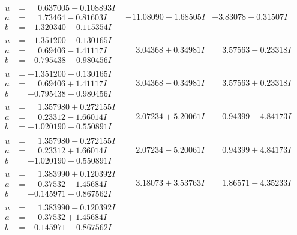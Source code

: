 \documentclass[1p]{elsarticle_modified}
\theoremstyle{definition}
\begin{document}
$$\begin{array}{c|c|c}
\begin{aligned}
u &= \phantom{-}0.637005 - 0.108893 I \\
a &= \phantom{-}1.73464 - 0.81603 I \\
b &= -1.320340 - 0.115354 I\end{aligned}
 & -11.08090 + 1.68505 I & -3.83078 - 0.31507 I \\ \hline\begin{aligned}
u &= -1.351200 + 0.130165 I \\
a &= \phantom{-}0.69406 - 1.41117 I \\
b &= -0.795438 + 0.980456 I\end{aligned}
 & \phantom{-}3.04368 + 0.34981 I & \phantom{-}3.57563 - 0.23318 I \\ \hline\begin{aligned}
u &= -1.351200 - 0.130165 I \\
a &= \phantom{-}0.69406 + 1.41117 I \\
b &= -0.795438 - 0.980456 I\end{aligned}
 & \phantom{-}3.04368 - 0.34981 I & \phantom{-}3.57563 + 0.23318 I \\ \hline\begin{aligned}
u &= \phantom{-}1.357980 + 0.272155 I \\
a &= \phantom{-}0.23312 - 1.66014 I \\
b &= -1.020190 + 0.550891 I\end{aligned}
 & \phantom{-}2.07234 + 5.20061 I & \phantom{-}0.94399 - 4.84173 I \\ \hline\begin{aligned}
u &= \phantom{-}1.357980 - 0.272155 I \\
a &= \phantom{-}0.23312 + 1.66014 I \\
b &= -1.020190 - 0.550891 I\end{aligned}
 & \phantom{-}2.07234 - 5.20061 I & \phantom{-}0.94399 + 4.84173 I \\ \hline\begin{aligned}
u &= \phantom{-}1.383990 + 0.120392 I \\
a &= \phantom{-}0.37532 - 1.45684 I \\
b &= -0.145971 + 0.867562 I\end{aligned}
 & \phantom{-}3.18073 + 3.53763 I & \phantom{-}1.86571 - 4.35233 I \\ \hline\begin{aligned}
u &= \phantom{-}1.383990 - 0.120392 I \\
a &= \phantom{-}0.37532 + 1.45684 I \\
b &= -0.145971 - 0.867562 I\end{aligned}

\end{array}$$
\end{document}
